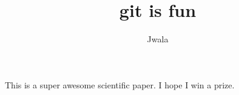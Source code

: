 \documentclass[10pt]{article}
\author{Jwala}
\title{git is fun}
\begin{document}
		\maketitle

		This is a super awesome scientific paper.
		I hope I win a prize.
\end{document}
